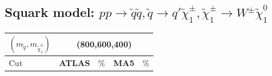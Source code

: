\documentclass[a4paper,11pt]{article}
\begin{document}
	\clearpage
	\subsection{Squark model: $p p \rightarrow \tilde q \tilde q , \tilde q \rightarrow q'  \tilde \chi _1 ^{\pm} , \tilde \chi _1 ^{\pm} \rightarrow W^{\pm} \tilde \chi _1 ^0$}
	
		\begin{table}[h]
		\centering
		\renewcommand\arraystretch{1.2} 
		\scriptsize
		\begin{tabular}{ | l | c c c c | } \toprule
			$(m_{\tilde q},m_{\tilde \chi _1 ^0})$ &	\multicolumn{4}{c|}{(800,600,400)} \\ \hline 
			
			Cut & \textbf{ATLAS} & $\%$ & \textbf{MA5} & $\%$  \\ \hline \hline		
			

\end{tabular}
\end{table}
\end{document}
